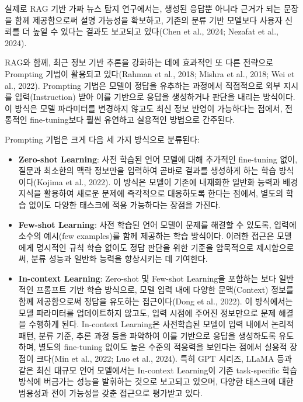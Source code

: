 \documentclass[a4paper,fleqn]{cas-sc}
\begin{document}
실제로 RAG 기반 가짜 뉴스 탐지 연구에서는, 생성된 응답뿐 아니라 근거가 되는 문장을 함께 제공함으로써 설명 가능성을 확보하고, 기존의 분류 기반 모델보다 사용자 신뢰를 더 높일 수 있다는 결과도 보고되고 있다(Chen et al., 2024; Nezafat et al., 2024).

RAG와 함께, 최근 정보 기반 추론을 강화하는 데에 효과적인 또 다른 전략으로 Prompting 기법이 활용되고 있다(Rahman et al., 2018; Mishra et al., 2018; Wei et al., 2022). Prompting 기법은 모델이 정답을 유추하는 과정에서 직접적으로 외부 지시를 입력(Instruction) 받아 이를 기반으로 응답을 생성하거나 판단을 내리는 방식이다. 이 방식은 모델 파라미터를 변경하지 않고도 최신 정보 반영이 가능하다는 점에서, 전통적인 fine-tuning보다 훨씬 유연하고 실용적인 방법으로 간주된다.

Prompting 기법은 크게 다음 세 가지 방식으로 분류된다:
\begin{itemize}
    \item{\textbf{Zero-shot Learning}:
    사전 학습된 언어 모델에 대해 추가적인 fine-tuning 없이, 질문과 최소한의 맥락 정보만을 입력하여 곧바로 결과를 생성하게 하는 학습 방식이다(Kojima et al., 2022). 이 방식은 모델이 기존에 내재화한 일반화 능력과 배경 지식을 활용하여 새로운 문제에 즉각적으로 대응하도록 한다는 점에서, 별도의 학습 없이도 다양한 태스크에 적용 가능하다는 장점을 가진다.}
    \item{\textbf{Few-shot Learning}:
    사전 학습된 언어 모델이 문제를 해결할 수 있도록, 입력에 소수의 예시(few examples)를 함께 제공하는 학습 방식이다. 이러한 접근은 모델에게 명시적인 규칙 학습 없이도 정답 판단을 위한 기준을 암묵적으로 제시함으로써, 분류 성능과 일반화 능력을 향상시키는 데 기여한다.}
    \item{\textbf{In-context Learning}:
    Zero-shot 및 Few-shot Learning을 포함하는 보다 일반적인 프롬프트 기반 학습 방식으로, 모델 입력 내에 다양한 문맥(Context) 정보를 함께 제공함으로써 정답을 유도하는 접근이다(Dong et al., 2022). 이 방식에서는 모델 파라미터를 업데이트하지 않고도, 입력 시점에 주어진 정보만으로 문제 해결을 수행하게 된다. In-context Learning은 사전학습된 모델이 입력 내에서 논리적 패턴, 분류 기준, 추론 과정 등을 파악하여 이를 기반으로 응답을 생성하도록 유도하며, 별도의 fine-tuning 없이도 높은 수준의 적응력을 보인다는 점에서 실용적 장점이 크다(Min et al., 2022; Luo et al., 2024). 특히 GPT 시리즈, LLaMA 등과 같은 최신 대규모 언어 모델에서는 In-context Learning이 기존 task-specific 학습 방식에 버금가는 성능을 발휘하는 것으로 보고되고 있으며, 다양한 태스크에 대한 범용성과 전이 가능성을 갖춘 접근으로 평가받고 있다.}
\end{itemize}
\end{document}
